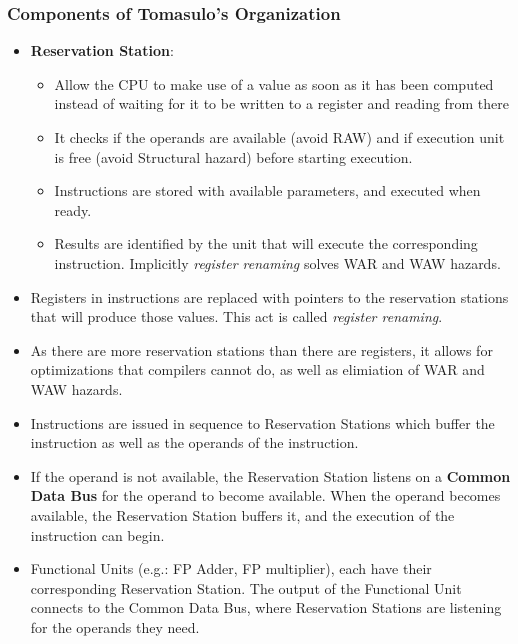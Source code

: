\documentclass{article}
\begin{document}
\subsubsection{Components of Tomasulo's Organization}
\begin{itemize}
    \item \textbf{Reservation Station}: 
    \begin{itemize}
        \item Allow the CPU to make use of a value as soon as it has been computed instead of waiting for it to be written to a register and reading from there
        
        \item It checks if the operands are available (avoid RAW) and if execution unit is free (avoid Structural hazard) before starting execution.
        
        \item Instructions are stored with available parameters, and executed when ready. 
        
        \item Results are identified by the unit that will execute the corresponding instruction. Implicitly \textit{register renaming} solves WAR and WAW hazards.
    \end{itemize}
    
    \item Registers in instructions are replaced with pointers to the reservation stations that will produce those values. This act is called \textit{register renaming}. 
    
    \item As there are more reservation stations than there are registers, it allows for optimizations that compilers cannot do, as well as elimiation of WAR and WAW hazards. 
    
    \item Instructions are issued in sequence to Reservation Stations which buffer the instruction as well as the operands of the instruction.
    
    \item If the operand is not available, the Reservation Station listens on a \textbf{Common Data Bus} for the operand to become available. When the operand becomes available, the Reservation Station buffers it, and the execution of the instruction can begin.

    \item Functional Units (e.g.: FP Adder, FP multiplier), each have their corresponding Reservation Station. The output of the Functional Unit connects to the Common Data Bus, where Reservation Stations are listening for the operands they need.
    

\end{itemize}
\end{document}
